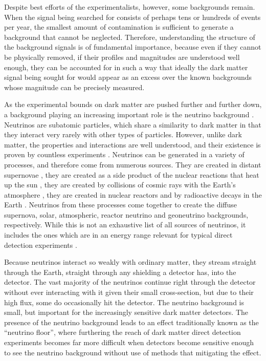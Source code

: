 \documentclass[b5paper, 10pt, twoside]{book}
\begin{document}
Despite best efforts of the experimentalists, however, some backgrounds remain. When the signal being searched for consists of perhaps tens or hundreds of events per year, the smallest amount of contamination is sufficient to generate a background that cannot be neglected. Therefore, understanding the structure of the background signals is of fundamental importance, because even if they cannot be physically removed, if their profiles and magnitudes are understood well enough, they can be accounted for in such a way that ideally the dark matter signal being sought for would appear as an excess over the known backgrounds whose magnitude can be precisely measured.

As the experimental bounds on dark matter are pushed further and further down, a background playing an increasing important role is the neutrino background \parencites{OHare2016, GaspertGiampaMorrissey2022}. Neutrinos are subatomic particles, which share a similarity to dark matter in that they interact very rarely with other types of particles. However, unlike dark matter, the properties and interactions are well understood, and their existence is proven by countless experiments \parencites{AharmimEtAl2013, AnEtAl2017, BasilicoEtAl2023, AbbasiEtAl2024, AbeEtAl2024, AbratenkoEtAl2024}. Neutrinos can be generated in a variety of processes, and therefore come from numerous sources. They are created in distant supernovae \parencite{Beacom2010}, they are created as a side product of the nuclear reactions that heat up the sun \parencites{BergstromEtAl2016, OrebiGann2021}, they are created by collisions of cosmic rays with the Earth's atmosphere \parencite{BattistoniEtAl2005}, they are created in nuclear reactors \parencites{MuellerEtAl2011, MaEtAl2013} and by radioactive decays in the Earth \parencites{LudhovaZavatarelli2013, HuangEtAl2013}. Neutrinos from these processes come together to create the diffuse supernova, solar, atmospheric, reactor neutrino and geoneutrino backgrounds, respectively. While this is not an exhaustive list of all sources of neutrinos, it includes the ones which are in an energy range relevant for typical direct detection experiments \parencite{VitaglianoTamborraRaffelt2020}.

Because neutrinos interact so weakly with ordinary matter, they stream straight through the Earth, straight through any shielding a detector has, into the detector. The vast majority of the neutrinos continue right through the detector without ever interacting with it given their small cross-section, but due to their high flux, some do occasionally hit the detector. The neutrino background is small, but important for the increasingly sensitive dark matter detectors. The presence of the neutrino background leads to an effect traditionally known as the ``neutrino floor'', where furthering the reach of dark matter direct detection experiments becomes far more difficult when detectors become sensitive enough to see the neutrino background without use of methods that mitigating the effect.
\end{document}

